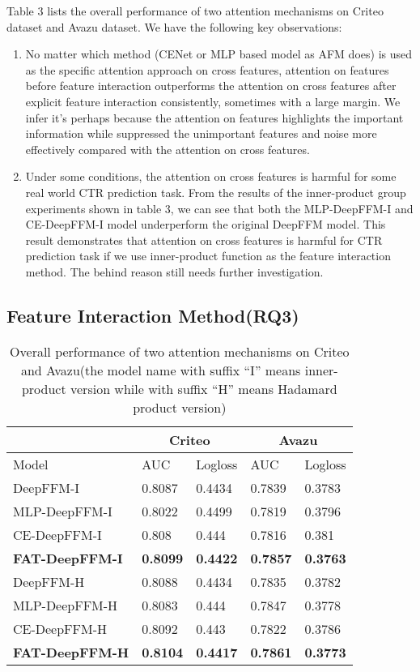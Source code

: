 \documentclass{article}
\begin{document}
Table 3 lists the overall performance of two attention mechanisms on Criteo dataset and Avazu dataset. We have the following key observations:
\begin{enumerate}
\item No matter which method (CENet or MLP based model as AFM does) is used as the specific attention approach on cross features, attention on features before feature interaction outperforms the attention on cross features after explicit feature interaction consistently, sometimes with a large margin. We infer it's perhaps because the attention on features highlights the important information while suppressed the unimportant features and noise more effectively compared with the attention on cross features. 
\item 	Under some conditions, the attention on cross features is harmful for some real world CTR prediction task. From the results of the inner-product group experiments shown in table 3, we can see that both the MLP-DeepFFM-I and CE-DeepFFM-I model underperform the original DeepFFM model. This result demonstrates that attention on cross features is harmful for CTR prediction task if we use inner-product function as the feature interaction method. The behind reason still needs further investigation.
\end{enumerate}

\subsection{Feature Interaction Method(RQ3)}




\begin{table}[]
\caption{Overall performance of two attention mechanisms on Criteo and Avazu(the model name with suffix ``I'' means inner-product version while with suffix ``H'' means Hadamard product version)}
\label{table:t3}
\begin{tabular}{lllll}
\hline
 & \multicolumn{2}{c}{Criteo} & \multicolumn{2}{c}{Avazu} \\ \hline
Model & AUC & Logloss & AUC & Logloss \\ \hline
DeepFFM-I & 0.8087 & 0.4434 & 0.7839 & 0.3783 \\
MLP-DeepFFM-I & 0.8022 & 0.4499 & 0.7819 & 0.3796 \\
CE-DeepFFM-I & 0.808 & 0.444 & 0.7816 & 0.381 \\
\textbf{FAT-DeepFFM-I} & \textbf{0.8099} & \textbf{0.4422} & \textbf{0.7857} & \textbf{0.3763} \\ \hline
DeepFFM-H & 0.8088 & 0.4434 & 0.7835 & 0.3782 \\
MLP-DeepFFM-H & 0.8083 & 0.444 & 0.7847 & 0.3778 \\
CE-DeepFFM-H & 0.8092 & 0.443 & 0.7822 & 0.3786 \\
\textbf{FAT-DeepFFM-H} & \textbf{0.8104} & \textbf{0.4417} & \textbf{0.7861} & \textbf{0.3773} \\ \hline
\end{tabular}
\end{table}
\end{document}
